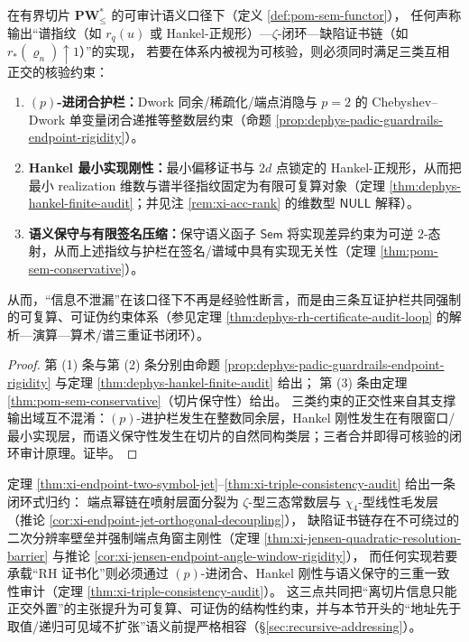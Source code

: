 \begin{theorem}\label{thm:xi-triple-consistency-audit}
在有界切片 \(\mathbf{PW}^{\ast}_{\le}\) 的可审计语义口径下（定义 \ref{def:pom-sem-functor}），
任何声称输出“谱指纹（如 \(r_q(u)\) 或 Hankel-正规形）—\(\zeta\)-闭环—缺陷证书链（如 \(r_\ast(\varrho_n)\uparrow 1\)）”的实现，
若要在体系内被视为可核验，则必须同时满足三类互相正交的核验约束：
\begin{enumerate}
  \item \textbf{\((p)\)-进闭合护栏：}Dwork 同余/稀疏化/端点消隐与 \(p=2\) 的 Chebyshev--Dwork 单变量闭合递推等整数层约束（命题 \ref{prop:dephys-padic-guardrails-endpoint-rigidity}）。
  \item \textbf{Hankel 最小实现刚性：}最小偏移证书与 \(2d\) 点锁定的 Hankel-正规形，从而把最小 realization 维数与谱半径指纹固定为有限可复算对象（定理 \ref{thm:dephys-hankel-finite-audit}；并见注 \ref{rem:xi-acc-rank} 的维数型 \(\mathsf{NULL}\) 解释）。
  \item \textbf{语义保守与有限签名压缩：}保守语义函子 \(\mathsf{Sem}\) 将实现差异约束为可逆 \(2\)-态射，从而上述指纹与护栏在签名/谱域中具有实现无关性（定理 \ref{thm:pom-sem-conservative}）。
\end{enumerate}
从而，“信息不泄漏”在该口径下不再是经验性断言，而是由三条互证护栏共同强制的可复算、可证伪约束体系（参见定理 \ref{thm:dephys-rh-certificate-audit-loop} 的解析—演算—算术/谱三重证书闭环）。
\end{theorem}

\begin{proof}
第 (1) 条与第 (2) 条分别由命题 \ref{prop:dephys-padic-guardrails-endpoint-rigidity} 与定理 \ref{thm:dephys-hankel-finite-audit} 给出；
第 (3) 条由定理 \ref{thm:pom-sem-conservative}（切片保守性）给出。
三类约束的正交性来自其支撑输出域互不混淆：\((p)\)-进护栏发生在整数同余层，Hankel 刚性发生在有限窗口/最小实现层，而语义保守性发生在切片的自然同构类层；三者合并即得可核验的闭环审计原理。证毕。
\end{proof}

\begin{remark}\label{rem:xi-publishable-reduction-closed-loop}
定理 \ref{thm:xi-endpoint-two-symbol-jet}--\ref{thm:xi-triple-consistency-audit} 给出一条闭环式归约：
端点幂链在喷射层面分裂为 \(\zeta\)-型三态常数层与 \(\chi_4\)-型线性毛发层（推论 \ref{cor:xi-endpoint-jet-orthogonal-decoupling}），
缺陷证书链存在不可绕过的二次分辨率壁垒并强制端点角窗主刚性（定理 \ref{thm:xi-jensen-quadratic-resolution-barrier} 与推论 \ref{cor:xi-jensen-endpoint-angle-window-rigidity}），
而任何实现若要承载“RH 证书化”则必须通过 \((p)\)-进闭合、Hankel 刚性与语义保守的三重一致性审计（定理 \ref{thm:xi-triple-consistency-audit}）。
这三点共同把“离切片信息只能正交外置”的主张提升为可复算、可证伪的结构性约束，并与本节开头的“地址先于取值/递归可见域不扩张”语义前提严格相容（\S\ref{sec:recursive-addressing}）。
\end{remark}

